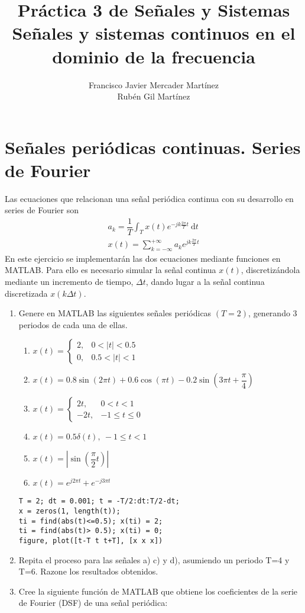 \documentclass{article}
\title{\textbf{\huge Práctica 3 de Señales y Sistemas}\\ Señales y sistemas continuos en el dominio de la frecuencia}
\author{Francisco Javier Mercader Martínez\\ Rubén Gil Martínez}
\date{}
\newcommand{\dt}{\:\mathrm{d}t}
\begin{document}
\section{Señales periódicas continuas. Series de Fourier}
Las ecuaciones que relacionan una señal periódica continua con su desarrollo en series de Fourier son \[ \begin{array}{l}
	a_k=\dfrac{1}{T}\int_Tx(t)e^{-jk\frac{2\pi}{T}t}\dt\\
	x(t)=\sum_{k=-\infty}^{+\infty}a_ke^{jk\frac{2\pi}{T}t}
\end{array} \]
En este ejercicio se implementarán las dos ecuaciones mediante funciones en MATLAB. Para ello es necesario simular la señal continua $x(t)$, discretizándola mediante un incremento de tiempo, $\Delta t$, dando lugar a la señal continua discretizada $x(k\Delta t)$.
\begin{enumerate}[leftmargin=*]
	\item Genere en MATLAB las siguientes señales periódicas $(T=2)$, generando 3 periodos de cada una de ellas.
	\begin{enumerate}[label=\alph*)]
		\item $x(t)=\begin{cases}
			2, & 0<|t|<0.5\\
			0,&0.5<|t|<1
		\end{cases}$
		\item $x(t)=0.8\sin(2\pi t)+0.6\cos(\pi t)-0.2\sin\left(3\pi t+\dfrac{\pi}{4}\right)$
		\item $x(t)=\begin{cases}
			2t, & 0<t<1\\
			-2t,&-1\le t\le0
		\end{cases}$
		\item $x(t)=0.5\delta(t),\:-1\le t<1$
		\item $x(t)=\left|\sin\left(\dfrac{\pi}{2}t\right)\right|$
		\item $x(t)=e^{j2\pi t}+e^{-j3\pi t}$
	\end{enumerate}
	\begin{lstlisting}
T = 2; dt = 0.001; t = -T/2:dt:T/2-dt;
x = zeros(1, length(t));
ti = find(abs(t)<=0.5); x(ti) = 2;
ti = find(abs(t)> 0.5); x(ti) = 0;
figure, plot([t-T t t+T], [x x x])
	\end{lstlisting}
	\item Repita el proceso para las señales a) c) y d), asumiendo un periodo T=4 y T=6. Razone los resultados obtenidos.
	\item Cree la siguiente función de MATLAB que obtiene los coeficientes de la serie de Fourier (DSF) de una señal periódica:
	

\end{enumerate}
\end{document}
